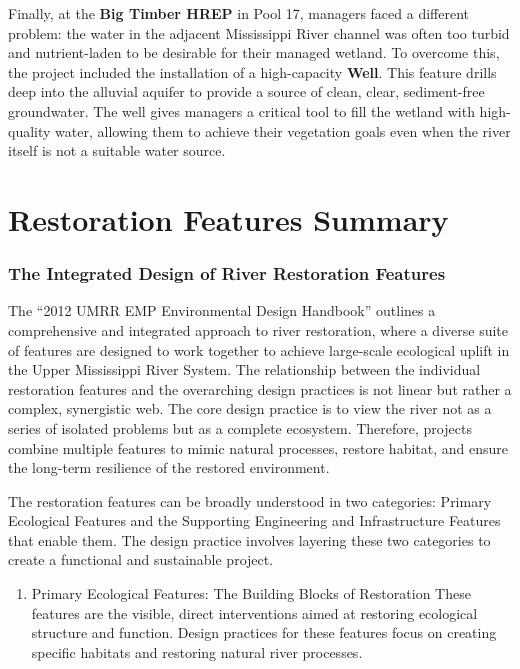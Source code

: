 \documentclass[
  letterpaper,
  DIV=11,
  numbers=noendperiod]{scrreprt}
\providecommand{\tightlist}{%
  \setlength{\itemsep}{0pt}\setlength{\parskip}{0pt}}
\begin{document}
Finally, at the \textbf{Big Timber HREP} in Pool 17, managers faced a
different problem: the water in the adjacent Mississippi River channel
was often too turbid and nutrient-laden to be desirable for their
managed wetland. To overcome this, the project included the installation
of a high-capacity \textbf{Well}. This feature drills deep into the
alluvial aquifer to provide a source of clean, clear, sediment-free
groundwater. The well gives managers a critical tool to fill the wetland
with high-quality water, allowing them to achieve their vegetation goals
even when the river itself is not a suitable water source.


\chapter{Restoration Features
Summary}\label{restoration-features-summary}

\subsection{The Integrated Design of River Restoration
Features}\label{the-integrated-design-of-river-restoration-features}

The ``2012 UMRR EMP Environmental Design Handbook'' outlines a
comprehensive and integrated approach to river restoration, where a
diverse suite of features are designed to work together to achieve
large-scale ecological uplift in the Upper Mississippi River System. The
relationship between the individual restoration features and the
overarching design practices is not linear but rather a complex,
synergistic web. The core design practice is to view the river not as a
series of isolated problems but as a complete ecosystem. Therefore,
projects combine multiple features to mimic natural processes, restore
habitat, and ensure the long-term resilience of the restored
environment.

The restoration features can be broadly understood in two categories:
Primary Ecological Features and the Supporting Engineering and
Infrastructure Features that enable them. The design practice involves
layering these two categories to create a functional and sustainable
project.

\begin{enumerate}
\def\labelenumi{\arabic{enumi}.}
\tightlist
\item
  Primary Ecological Features: The Building Blocks of Restoration These
  features are the visible, direct interventions aimed at restoring
  ecological structure and function. Design practices for these features
  focus on creating specific habitats and restoring natural river
  processes.
\end{enumerate}
\end{document}

